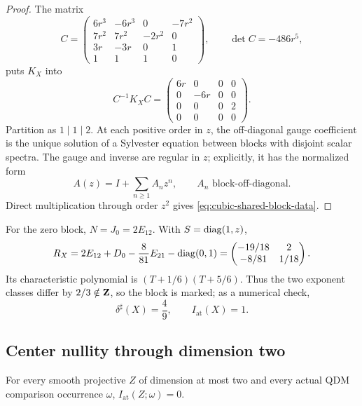 \begin{proof}
The matrix
\[
 C=\begin{pmatrix}
 6r^3&-6r^3&0&-7r^2\\7r^2&7r^2&-2r^2&0\\
 3r&-3r&0&1\\1&1&1&0
 \end{pmatrix},
 \qquad \det C=-486r^5,
\]
puts \(K_X\) into
\[
 C^{-1}K_XC=
 \begin{pmatrix}6r&0&0&0\\0&-6r&0&0\\0&0&0&2\\0&0&0&0\end{pmatrix}.
\]
Partition as \(1\mid1\mid2\).  At each positive order in \(z\), the
off-diagonal gauge coefficient is the unique solution of a Sylvester
equation between blocks with disjoint scalar spectra.  The gauge and inverse
are regular in \(z\); explicitly, it has the normalized form
\begin{equation}
 A(z)=I+\sum_{n\ge1}A_nz^n,
 \qquad A_n\text{ block-off-diagonal}.
 \label{eq:cubic-integral-block-gauge}
\end{equation}
Direct multiplication through order \(z^2\) gives
\eqref{eq:cubic-shared-block-data}.
\end{proof}

For the zero block, \(N=J_0=2E_{12}\).  With \(S=\operatorname{diag}(1,z)\),
\begin{equation}
 R_X
 =2E_{12}+D_0-\frac8{81}E_{21}-\operatorname{diag}(0,1)
 =\begin{pmatrix}-19/18&2\\-8/81&1/18\end{pmatrix}.
 \label{eq:RX}
\end{equation}
Its characteristic polynomial is
\((T+1/6)(T+5/6)\).  Thus the two exponent classes differ by
\(2/3\notin\mathbf Z\), so the block is marked; as a numerical check,
\begin{equation}
 \boxed{\delta^\sharp(X)=\frac49},
 \qquad I_{\mathrm{at}}(X)=1.
 \label{eq:cubic-delta}
\end{equation}

\subsection{Center nullity through dimension two}

\begin{proposition}
\label{prop:atomic-lowdim}
%
%
%
%
For every smooth projective \(Z\) of dimension at most two and every actual
QDM comparison occurrence \(\omega\),
\(I_{\mathrm{at}}(Z;\omega)=0\).
\end{proposition}

